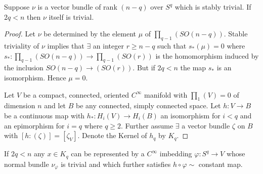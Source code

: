  \begin{lemma}\label{chap1:lem4.2}%
Suppose $\nu$ is a vector bundle of rank $(n-q)$ over $S^q$ which is
stably trivial. If $2q < n$ then $\nu$ itself is trivial.  
 \end{lemma} 
 
 \begin{proof}%
Let $\nu$ be determined by the element $\mu$ of $\prod_{q-1}(SO
(n-q))$. Stable triviality of $\nu$ implies that $\exists$ an integer
$r \geq n-q$ such that $s_* (\mu) = 0$ where $s_*: \prod_{q-1}(SO
(n-q)) \rightarrow \prod_{q-1}(SO(r))$ is the homomorphism induced by
the inclusion $SO(n-q) \rightarrow (SO(r))$. But if $2 q< n$ the map
$s_* $ is an isomorphism. Hence $\mu = 0$.  
 
 Let $V$ be a compact, connected, oriented $C^\infty$ manifold with
 $\prod_1(V) = 0$ of dimension $n$ and let $B$ be any connected,
 simply connected space. Let $h: V \rightarrow B$ be a continuous map
 with $h_*: H_i (V) \rightarrow H_i (B)$ an isomorphism for $ i < q$
 and an epimorphism for $i = q$ where $q \geq 2$. Further assume
 $\exists $ a vector bundle $\zeta$ on $B$ with $[h: (\zeta)] =
 [\zeta_V]$. Denote the Kernel of $h_q$ by $K_q$.  
 \end{proof}

 \begin{lemma}\label{chap1:lem4.3}%
If $2q <n $ any $x \in K_q $ can be represented by a $C^\infty $
imbedding $\varphi : S^q \rightarrow V $ whose normal bundle
$\nu_\varphi $ is trivial and which further satisfies $h \circ \varphi
\sim$ constant map.  
 \end{lemma} 
 
